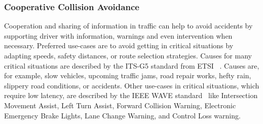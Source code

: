 \subsubsection{Cooperative Collision Avoidance}
Cooperation and sharing of information in traffic can help to avoid accidents by supporting driver with information, warnings and even intervention when necessary. Preferred use-cases are to avoid getting in critical situations by adapting speeds, safety distances, or route selection strategies. Causes for many critical situations are described by the ITS-G5 standard from ETSI ~\cite{EN3026373}. Causes are, for example, slow vehicles, upcoming traffic jams, road repair works, hefty rain, slippery road conditions, or accidents. Other use-cases in critical situations, which require low latency, are described by the IEEE WAVE standard~\cite{4939288} like Intersection Movement Assist, Left Turn Assist, Forward Collision Warning, Electronic Emergency Brake Lights, Lane Change Warning, and Control Loss warning. 

